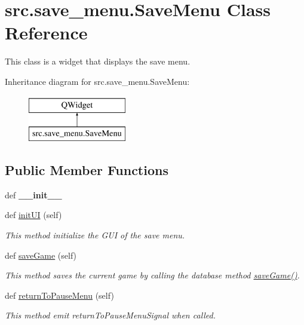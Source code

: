 \hypertarget{classsrc_1_1save__menu_1_1_save_menu}{}\section{src.\+save\+\_\+menu.\+Save\+Menu Class Reference}
\label{classsrc_1_1save__menu_1_1_save_menu}


This class is a widget that displays the save menu.  


Inheritance diagram for src.\+save\+\_\+menu.\+Save\+Menu\+:\begin{figure}[H]
\begin{center}
\leavevmode
\includegraphics[height=2.000000cm]{classsrc_1_1save__menu_1_1_save_menu}
\end{center}
\end{figure}
\subsection*{Public Member Functions}
\begin{DoxyCompactItemize}
\item 
\hypertarget{classsrc_1_1save__menu_1_1_save_menu_aec50d1d33e455ba8ea30063059ba3270}{}def {\bfseries \+\_\+\+\_\+init\+\_\+\+\_\+}\label{classsrc_1_1save__menu_1_1_save_menu_aec50d1d33e455ba8ea30063059ba3270}

\item 
def \hyperlink{classsrc_1_1save__menu_1_1_save_menu_a69135ce0e32c0ec25e23f4cea0a0eae8}{init\+U\+I} (self)
\begin{DoxyCompactList}\small\item\em This method initialize the G\+U\+I of the save menu. \end{DoxyCompactList}\item 
def \hyperlink{classsrc_1_1save__menu_1_1_save_menu_a318487ca9ed34963dd572faa1ce09c56}{save\+Game} (self)
\begin{DoxyCompactList}\small\item\em This method saves the current game by calling the database method \hyperlink{classsrc_1_1save__menu_1_1_save_menu_a318487ca9ed34963dd572faa1ce09c56}{save\+Game()}. \end{DoxyCompactList}\item 
def \hyperlink{classsrc_1_1save__menu_1_1_save_menu_a91e3ce3f4563456db3102294459a8c43}{return\+To\+Pause\+Menu} (self)
\begin{DoxyCompactList}\small\item\em This method emit return\+To\+Pause\+Menu\+Signal when called. \end{DoxyCompactList}\end{DoxyCompactItemize}
